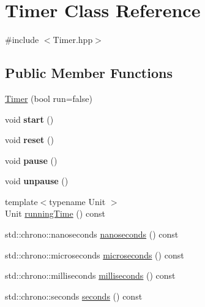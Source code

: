 \hypertarget{class_timer}{\section{Timer Class Reference}
\label{class_timer}
}


{\ttfamily \#include $<$Timer.\+hpp$>$}

\subsection*{Public Member Functions}
\begin{DoxyCompactItemize}
\item 
\hyperlink{class_timer_aab51589602494ed3f9aba851dc00ff45}{Timer} (bool run=false)
\item 
\hypertarget{class_timer_a3a8b5272198d029779dc9302a54305a8}{void {\bfseries start} ()}\label{class_timer_a3a8b5272198d029779dc9302a54305a8}

\item 
\hypertarget{class_timer_a9020542d73357a4eef512eefaf57524b}{void {\bfseries reset} ()}\label{class_timer_a9020542d73357a4eef512eefaf57524b}

\item 
\hypertarget{class_timer_a0289effad7b573c508bc27e405900a23}{void {\bfseries pause} ()}\label{class_timer_a0289effad7b573c508bc27e405900a23}

\item 
\hypertarget{class_timer_aa4dd50d7ed48ac73efed2950749d35d6}{void {\bfseries unpause} ()}\label{class_timer_aa4dd50d7ed48ac73efed2950749d35d6}

\item 
{\footnotesize template$<$typename Unit $>$ }\\Unit \hyperlink{class_timer_a36b9bf710c37b6394c93960c515ba20c}{running\+Time} () const 
\item 
std\+::chrono\+::nanoseconds \hyperlink{class_timer_a9c9acd2b0e51984bbaf6b066f0b47f03}{nanoseconds} () const 
\item 
std\+::chrono\+::microseconds \hyperlink{class_timer_a9965655cf9bd4ee646af97e7558797e3}{microseconds} () const 
\item 
std\+::chrono\+::milliseconds \hyperlink{class_timer_a39c96e027b87ce416be309668dc02c2a}{milliseconds} () const 
\item 
std\+::chrono\+::seconds \hyperlink{class_timer_a9eea487e771e45f9983e4cb8aab3f876}{seconds} () const 
\end{DoxyCompactItemize}
